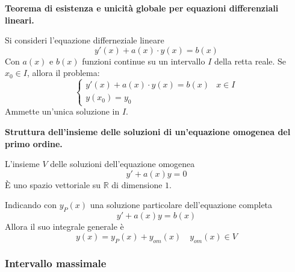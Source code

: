 \documentclass[a4paper]{article}
\newcommand{\definition}[1]{\textcolor{Red3}{\textbf{#1}}}
\begin{document}
	\begin{boxdef}
		\definition{Teorema di esistenza e unicità globale per equazioni differenziali lineari.}\newline

		Si consideri l'equazione differneziale lineare
		\begin{equation*}
			y'\left(x\right) + a\left(x\right) \cdot y\left(x\right) = b\left(x\right)
		\end{equation*}
		Con $a\left(x\right)$ e $b\left(x\right)$ funzioni continue su un intervallo $I$ della retta reale. Se $x_{0} \in I$, allora il problema:
		\begin{equation*}
			\begin{cases}
				y'\left(x\right) + a\left(x\right) \cdot y\left(x\right) = b\left(x\right) & x \in I \\
				y\left(x_{0}\right) = y_{0}
			\end{cases}
		\end{equation*}
		Ammette un'unica soluzione in $I$.
	\end{boxdef}
	
	\begin{boxdef}
		\definition{Struttura dell'insieme delle soluzioni di un'equazione omogenea del primo ordine.}\newline

		L'insieme $V$ delle soluzioni dell'equazione omogenea
		\begin{equation*}
			y' + a\left(x\right)y = 0
		\end{equation*}
		È uno spazio vettoriale su $\mathbb{R}$ di dimensione $1$.

		Indicando con $y_{P}\left(x\right)$ una soluzione particolare dell'equazione completa
		\begin{equation*}
			y' + a\left(x\right) y = b\left(x\right)
		\end{equation*}
		Allora il suo integrale generale è
		\begin{equation*}
			y\left(x\right) = y_{P}\left(x\right) + y_{om}\left(x\right) \hspace{1em} y_{om}\left(x\right) \in V
		\end{equation*}
	\end{boxdef}\newpage

	\subsubsection{Intervallo massimale}\label{subsubsection: intervallo massimale}
\end{document}
